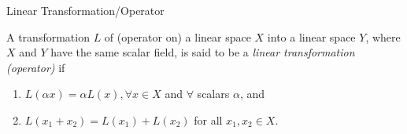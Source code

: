 \documentclass[avery5388,grid,frame]{flashcards}
\begin{document}
\begin{flashcard}[Definition]{Linear Transformation/Operator}

  A transformation $L$ of (operator on) a linear space $X$ into a linear
  space $Y$, where $X$ and $Y$ have the same scalar field, is said to be
  a \emph{linear transformation (operator)} if

  \medskip

  \begin{enumerate}
    \item $L(\alpha x) = \alpha L(x), \forall x\in X$ and $\forall$
          scalars $\alpha$, and
    \item $L(x_1 + x_2) = L(x_1) + L(x_2)$ for all $x_1,x_2 \in X$.
  \end{enumerate}

\end{flashcard}
\end{document}
